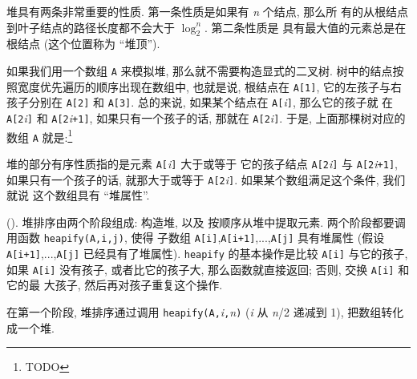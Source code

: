 堆具有两条非常重要的性质. 第一条性质是如果有 \textit{n} 个结点, 那么所
有的从根结点到叶子结点的路径长度都不会大于 $\log_2^n$. 第二条性质是
具有最大值的元素总是在根结点 (这个位置称为 ``堆顶'').

如果我们用一个数组 \texttt{A} 来模拟堆, 那么就不需要构造显式的二叉树.
树中的结点按照宽度优先遍历的顺序出现在数组中, 也就是说, 根结点在 
\texttt{A[1]}, 它的左孩子与右孩子分别在 \texttt{A[2]} 和 \texttt{A[3]}.
总的来说, 如果某个结点在 \texttt{A[}\textit{i}\texttt{]}, 那么它的孩子就
在 \texttt{A[2}\textit{i}\texttt{]} 和 \texttt{A[2}\textit{i}\texttt{+1]},
如果只有一个孩子的话, 那就在 \texttt{A[2}\textit{i}\texttt{]}.
于是, 上面那棵树对应的数组 \texttt{A} 就是:\footnote{TODO}

堆的部分有序性质指的是元素 \texttt{A[}\textit{i}\texttt{]} 大于或等于
它的孩子结点 \texttt{A[2}\textit{i}\texttt{]} 与
\texttt{A[2}\textit{i}\texttt{+1]}, 如果只有一个孩子的话, 就那大于或等于
\texttt{A[2}\textit{i}\texttt{]}. 如果某个数组满足这个条件, 我们就说
这个数组具有 ``堆属性''.

 (). 堆排序由两个阶段组成: 构造堆, 以及 
按顺序从堆中提取元素. 两个阶段都要调用函数 \texttt{heapify(A,i,j)}, 使得
子数组 \texttt{A[i]},\texttt{A[i+1]},...,\texttt{A[j]} 具有堆属性 (假设 
\texttt{A[i+1]},...,\texttt{A[j]} 已经具有了堆属性). \texttt{heapify}
的基本操作是比较 \texttt{A[i]} 与它的孩子, 如果 \texttt{A[i]} 没有孩子,
或者比它的孩子大, 那么函数就直接返回; 否则, 交换 \texttt{A[i]} 和它的最
大孩子, 然后再对孩子重复这个操作.

在第一个阶段, 堆排序通过调用
\texttt{heapify(A,}\textit{i}\texttt{,}\textit{n}\texttt{)} (\textit{i} 从
\textit{n}/2 递减到 1), 把数组转化成一个堆.
